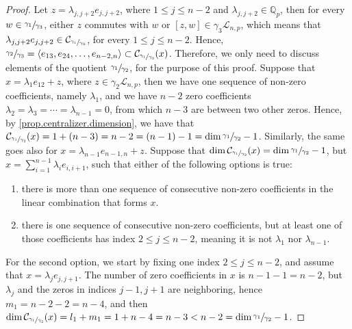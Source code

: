 \documentclass[12pt]{article}
\begin{document}
\begin{proof}
Let $z=\lambda_{j,j+2}e_{j,j+2}$, where $1\leq j\leq n-2$ and $\lambda_{j,j+2}\in\mathbb{Q}_p$, then for every $w\in\sfrac{\gamma_1}{\gamma_3}$, either $z$ commutes with $w$ or $[z,w]\in\gamma_3\mathcal{L}_{n,p}$, which means that $\lambda_{j,j+2}e_{j,j+2}\in\mathcal{C}_{\sfrac{\gamma_1}{\gamma_3}}$, for every $1\leq j\leq n-2$. Hence, $\sfrac{\gamma_2}{\gamma_3}=\langle e_{13},e_{24},\dots,e_{n-2,n}\rangle\subset\mathcal{C}_{\sfrac{\gamma_1}{\gamma_3}}(x)$. Therefore, we only need to discuss elements of the quotient $\sfrac{\gamma_1}{\gamma_2}$, for the purpose of this proof.
Suppose that $x=\lambda_1 e_{12}+z$, where $z\in\gamma_2 \mathcal{L}_{n,p}$, then we have one sequence of non-zero coefficients, namely $\lambda_1$, and we have $n-2$ zero coefficients $\lambda_2=\lambda_3=\cdots=\lambda_{n-1}=0$, from which $n-3$ are between two other zeros. Hence, by \ref{prop.centralizer.dimension}, we have that $\mathcal{C}_{\sfrac{\gamma_1}{\gamma_2}}(x)=1+(n-3)=n-2=(n-1)-1=\dim\sfrac{\gamma_1}{\gamma_2}-1$. Similarly, the same goes also for $x=\lambda_{n-1}e_{n-1,n}+z$.
Suppose that $\dim\mathcal{C}_{\sfrac{\gamma_1}{\gamma_2}}(x)=\dim\sfrac{\gamma_1}{\gamma_2}-1$, but $x=\sum_{i=1}^{n-1}\lambda_i e_{i,i+1}$, such that either of the following options is true:
\begin{enumerate}
  \item there is more than one sequence of consecutive non-zero coefficients in the linear combination that forms $x$.
  \item there is one sequence of consecutive non-zero coefficients, but at least one of those coefficients has index $2\leq j\leq n-2$, meaning it is not $\lambda_1$ nor $\lambda_{n-1}$.
\end{enumerate}
For the second option, we start by fixing one index $2\leq j\leq n-2$, and assume that $x=\lambda_j e_{j,j+1}$. The number of zero coefficients in $x$ is $n-1-1=n-2$, but $\lambda_j$ and the zeros in indices $j-1,j+1$ are neighboring, hence $m_1=n-2-2=n-4$, and then $\dim\mathcal{C}_{\sfrac{\gamma_1}{\gamma_2}}(x)=l_1+m_1=1+n-4=n-3<n-2=\dim\sfrac{\gamma_1}{\gamma_2}-1$.

\end{proof}
\end{document}
